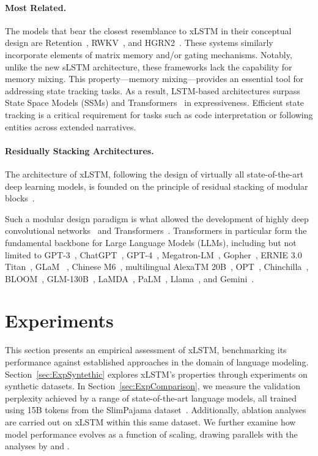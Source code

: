 \paragraph{Most Related.} The models that bear the closest resemblance to xLSTM in their conceptual design are Retention~\citep{Sun:23arxiv}, RWKV~\citep{Peng:23arxivshort,Peng:24arxivshort}, and HGRN2~\citep{Qin:24arxiv}. These systems similarly incorporate elements of matrix memory and/or gating mechanisms. Notably, unlike the new sLSTM architecture, these frameworks lack the capability for memory mixing. This property—memory mixing—provides an essential tool for addressing state tracking tasks. As a result, LSTM-based architectures surpass State Space Models (SSMs) and Transformers~\citep{Merrill:24,Deletang:23} in expressiveness. Efficient state tracking is a critical requirement for tasks such as code interpretation or following entities across extended narratives.

\paragraph{Residually Stacking Architectures.} The architecture of xLSTM, following the design of virtually all state-of-the-art deep learning models, is founded on the principle of residual stacking of modular blocks~\citep{Srivastava:15,He:16}.

Such a modular design paradigm is what allowed the development of highly deep convolutional networks~\citep{He:16} and Transformers~\citep{Vaswani:17}. Transformers in particular form the fundamental backbone for Large Language Models (LLMs), including but not limited to GPT-3~\citep{Brown:20short}, ChatGPT~\citep{Schulman:22short}, GPT-4~\citep{Achiam:23gpt4short}, Megatron-LM~\citep{Shoeybi:19}, Gopher~\citep{Rae:21short}, ERNIE 3.0 Titan~\citep{Wang:21arxivshort}, GLaM ~\citep{Du:21glamshort}, Chinese M6~\citep{Lin:21}, multilingual AlexaTM 20B~\citep{Soltan:22}, OPT~\citep{Zhang:22opt}, Chinchilla~\citep{Hoffmann:22short}, BLOOM~\citep{Scao:22arxivshort}, GLM-130B~\citep{Zeng:22arxivshort}, LaMDA~\citep{Thoppilan:22short}, PaLM~\citep{Chowdhery:22short}, Llama~\citep{Touvron:23arxiv}, and Gemini~\citep{GeminiTeam:23arxiv,Reid:24arxiv}.

\section{Experiments}
\label{sec:Exp}

This section presents an empirical assessment of xLSTM, benchmarking its performance against established approaches in the domain of language modeling. Section~\ref{sec:ExpSyntethic} explores xLSTM's properties through experiments on synthetic datasets. In Section~\ref{sec:ExpComparison}, we measure the validation perplexity achieved by a range of state-of-the-art language models, all trained using 15B tokens from the SlimPajama dataset~\citep{Soboleva:23}. Additionally, ablation analyses are carried out on xLSTM within this same dataset. We further examine how model performance evolves as a function of scaling, drawing parallels with the analyses by \citet{Kaplan:20} and \citet{Brown:20short}. 


